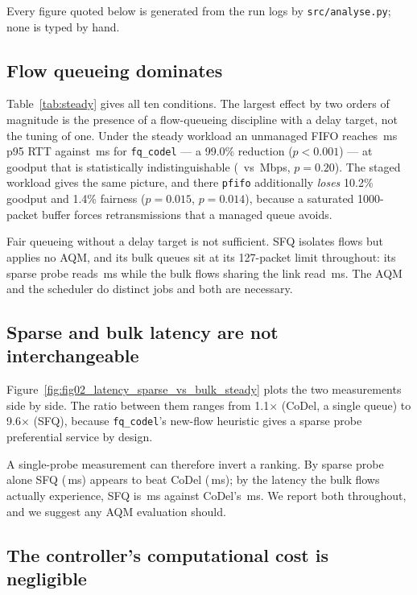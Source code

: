 Every figure quoted below is generated from the run logs by
\texttt{src/analyse.py}; none is typed by hand.

\subsection{Flow queueing dominates}

Table~\ref{tab:steady} gives all ten conditions. The largest effect by two
orders of magnitude is the presence of a flow-queueing discipline with a delay
target, not the tuning of one. Under the steady workload an unmanaged FIFO
reaches \PfifoProbeRttPninetyfiveSteady\,ms p95 RTT against
\FqCodelProbeRttPninetyfiveSteady\,ms for \texttt{fq\_codel} --- a 99.0\%
reduction ($p<0.001$) --- at goodput that is statistically indistinguishable
(\PfifoGoodputSteady\ vs \FqCodelGoodputSteady\,Mbps, $p=0.20$). The staged
workload gives the same picture, and there \texttt{pfifo} additionally
\emph{loses} 10.2\% goodput and 1.4\% fairness ($p=0.015$, $p=0.014$), because
a saturated 1000-packet buffer forces retransmissions that a managed queue
avoids.

Fair queueing without a delay target is not sufficient. SFQ isolates flows but
applies no AQM, and its bulk queues sit at its 127-packet limit throughout:
its sparse probe reads \SfqProbeRttMeanSteady\,ms while the bulk flows sharing
the link read \SfqBulkRttMeanSteady\,ms. The AQM and the scheduler do distinct
jobs and both are necessary.

\subsection{Sparse and bulk latency are not interchangeable}

Figure~\ref{fig:fig02_latency_sparse_vs_bulk_steady} plots the two
measurements side by side. The ratio between them ranges from 1.1$\times$
(CoDel, a single queue) to 9.6$\times$ (SFQ), because \texttt{fq\_codel}'s
new-flow heuristic gives a sparse probe preferential service by design.

A single-probe measurement can therefore invert a ranking. By
sparse probe alone SFQ (\SfqProbeRttMeanSteady\,ms) appears to beat CoDel
(\CodelProbeRttMeanSteady\,ms); by the latency the bulk flows actually
experience, SFQ is \SfqBulkRttMeanSteady\,ms against CoDel's
\CodelBulkRttMeanSteady\,ms. We report both throughout, and we suggest any AQM
evaluation should.

\subsection{The controller's computational cost is negligible}

